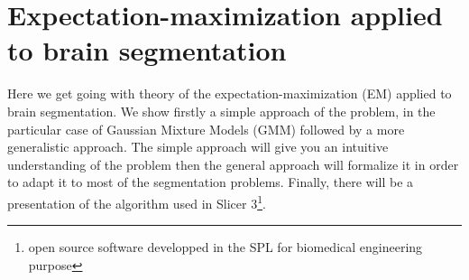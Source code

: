 \chapter{Expectation-maximization applied to brain segmentation}\label{sec:EM}
%
Here we get going with theory of the expectation-maximization (EM) applied to brain segmentation. We show firstly a simple approach of the problem, in the particular case of Gaussian Mixture Models (GMM) followed by a more generalistic approach. The simple approach will give you an intuitive understanding of the problem then the general approach will formalize it in order to adapt it to most of the segmentation problems. Finally, there will be a presentation of the algorithm used in Slicer 3\footnote{open source software developped in the SPL for biomedical engineering purpose}.
%
